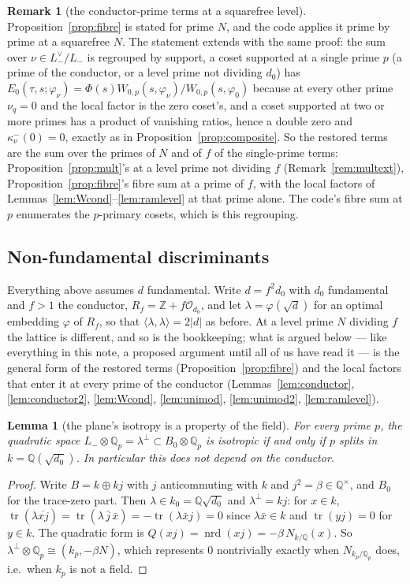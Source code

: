 \documentclass[11pt,reqno]{amsart}
\theoremstyle{plain}
\newtheorem{lemma}[theorem]{Lemma}
\theoremstyle{definition}
\newtheorem{remark}[theorem]{Remark}
\DeclareMathOperator{\tr}{tr}
\DeclareMathOperator{\nrd}{nrd}
\newcommand{\Q}{\mathbb{Q}}
\newcommand{\Z}{\mathbb{Z}}
\newcommand{\Lm}{L_{-}}
\begin{document}
\begin{remark}[the conductor-prime terms at a squarefree level]\label{rem:fibrecomp}
Proposition~\ref{prop:fibre} is stated for prime $N$, and the code applies it prime by prime at a
squarefree $N$. The statement extends with the same proof: the sum over $\nu\in\Lm^\vee/\Lm$ is
regrouped by support, a coset supported at a single prime $p$ (a prime of the conductor, or a level
prime not dividing $d_0$) has $E_0(\tau,s;\varphi_\nu)=\Phi(s)W_{0,p}(s,\varphi_\nu)/W_{0,p}(s,
\varphi_0)$ because at every other prime $\nu_q=0$ and the local factor is the zero coset's, and a
coset supported at two or more primes has a product of vanishing ratios, hence a double zero and
$\kappa^-_\nu(0)=0$, exactly as in Proposition~\ref{prop:composite}. So the restored terms are the
sum over the primes of $N$ and of $f$ of the single-prime terms: Proposition~\ref{prop:mult}'s at a
level prime not dividing $f$ (Remark~\ref{rem:multext}), Proposition~\ref{prop:fibre}'s fibre sum at
a prime of $f$, with the local factors of Lemmas~\ref{lem:Wcond}--\ref{lem:ramlevel} at that prime
alone. The code's fibre sum at $p$ enumerates the $p$-primary cosets, which is this regrouping.
\end{remark}


\subsection*{Non-fundamental discriminants}

Everything above assumes $d$ fundamental. Write $d=f^2d_0$ with $d_0$ fundamental and $f>1$ the
conductor, $R_f=\Z+f\mathcal O_{d_0}$, and let $\lambda=\varphi(\sqrt d)$ for an optimal embedding
$\varphi$ of $R_f$, so that $\langle\lambda,\lambda\rangle=2\lvert d\rvert$ as before. At a level prime $N$ dividing $f$ the lattice is different, and so is the bookkeeping;
what is argued below --- like everything in this note, a proposed argument until all of us have
read it --- is the general form of the restored terms (Proposition~\ref{prop:fibre}) and the
local factors that enter it at every prime of the conductor (Lemmas~\ref{lem:conductor},
\ref{lem:conductor2}, \ref{lem:Wcond}, \ref{lem:unimod}, \ref{lem:unimod2}, \ref{lem:ramlevel}).

\begin{lemma}[the plane's isotropy is a property of the field]\label{lem:split}
For every prime $p$, the quadratic space $\Lm\otimes\Q_p=\lambda^\perp\subset B_0\otimes\Q_p$ is
isotropic if and only if $p$ splits in $k=\Q(\sqrt{d_0})$. In particular this does not depend on
the conductor.
\end{lemma}
\begin{proof}
Write $B=k\oplus kj$ with $j$ anticommuting with $k$ and $j^2=\beta\in\Q^\times$, and $B_0$ for the
trace-zero part. Then $\lambda\in k_0=\Q\sqrt{d_0}$ and $\lambda^\perp=kj$: for $x\in k$,
$\tr(\lambda\overline{xj})=\tr(\lambda\,\bar j\,\bar x)=-\tr(\lambda\bar x j)=0$ since $\lambda\bar x
\in k$ and $\tr(yj)=0$ for $y\in k$. The quadratic form is $Q(xj)=\nrd(xj)=-\beta\,N_{k/\Q}(x)$.
So $\lambda^\perp\otimes\Q_p\cong(k_p,-\beta N)$, which represents $0$ nontrivially exactly when
$N_{k_p/\Q_p}$ does, i.e.\ when $k_p$ is not a field.
\end{proof}
\end{document}
